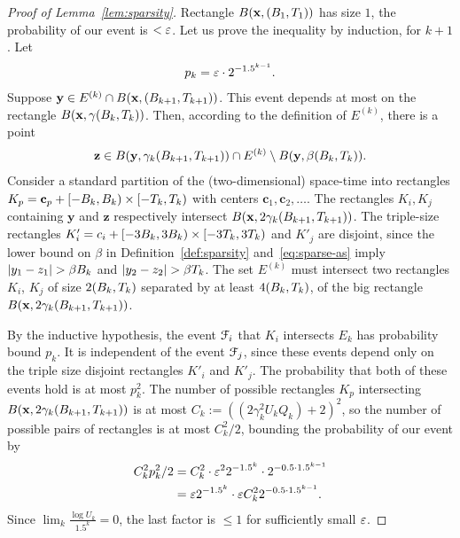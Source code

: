 \documentclass[11pt]{memoir}
\theoremstyle{definition} %
\renewcommand{\le}{\leq}
\renewcommand{\vek}[1]{\mathbf{#1}}
\def\B{B}
\def\U{U}
\newcommand{\Q}{Q} %
\newcommand{\Tu}{T}
\newcommand{\x}{\vek{x}} %
\newcommand{\y}{\vek{y}} %
\begin{document}
\begin{proof}[Proof of Lemma~\ref{lem:sparsity}]
Rectangle \( B(\x,\pair{\B_{1}}{\Tu_{1}}) \) has size \( 1 \),
the probability of our event is \( <\varepsilon \).
Let us prove the inequality by induction, for \( k+1 \).
Let
\begin{align*}
   p_{k}= \varepsilon\cdot 2^{-1.5^{k-1}}.
\end{align*}
Suppose \( \y \in E^{(k)}\cap B(\x,\pair{\B_{k+1}}{\Tu_{k+1}}) \).
This event depends at most on the rectangle \( B(\x,\gamma\pair{\B_{k}}{\Tu_{k}}) \).
Then, according to the definition of \( E^{(k)} \),  there is a point
\begin{align}\label{eq:sparse-as}
 \vek{z} \in
 B(\y,\gamma_{k}\pair{\B_{k+1}}{\Tu_{k+1}})\cap E^{(k)}\setminus B(\y,\beta\pair{\B_{k}}{\Tu_{k}}).
 \end{align}
Consider a standard partition of the (two-dimensional) space-time into
rectangles \( K_{p}=\vek{c}_{p}+\lint{-\B_{k}}{\B_{k}}\times \lint{-\Tu_{k}}{\Tu_{k}} \)
with centers \( \vek{c}_{1},\vek{c}_{2},\dots \).
The rectangles \( K_{i},K_{j} \) containing \( \vek{y} \) and \( \vek{z} \)
respectively intersect \( B(\x, 2\gamma_{k}\pair{\B_{k+1}}{\Tu_{k+1}}) \).
The triple-size rectangles 
\( K'_{i}=c_{i} + \lint{-3\B_{k}}{3\B_{k}}\times \lint{-3\Tu_{k}}{3\Tu_{k}} \) and
\( K'_{j} \) are disjoint, since the lower bound on \( \beta \) in Definition~\ref{def:sparsity}
and~\eqref{eq:sparse-as} imply
 \( \abs{y_{1} - z_{1}}>\beta\B_{k} \) and \( \abs{y_{2} - z_{2}}>\beta\Tu_{k} \).
The set \( E^{(k)} \) must intersect two rectangles \( K_{i} \),
\( K_{j} \) of size \( 2\pair{\B_{k}}{\Tu_{k}} \) separated by at least \( 4\pair{\B_{k}}{\Tu_{k}} \),
of the big rectangle \( B(\x, 2\gamma_{k}\pair{\B_{k+1}}{\Tu_{k+1}}) \).
 
By the inductive hypothesis, the event \( \mathcal{F}_{i} \) that
\( K_{i} \) intersects \( E_{k} \) has probability bound \( p_{k} \).
It is independent of the event \( \mathcal{F}_{j} \), since these events depend
only on the triple size disjoint rectangles \( K'_{i} \) and \( K'_{j} \).
The probability that both of these events hold is at most \( p_{k}^{2} \).
The number of possible rectangles
\( K_{p} \) intersecting \( B(\x, 2\gamma_{k}\pair{\B_{k+1}}{\Tu_{k+1}}) \) is
at most
\( C_{k}:=((2\gamma_{k}^{2}\U_{k} \Q_{k})+2)^{2} \), so the number of possible pairs of rectangles
is at most \( C_{k}^{2}/2 \), bounding the probability of our event by
 \begin{align*}
   C_{k}^{2}p_{k}^{2}/2
    &=
      C_{k}^{2}\cdot \varepsilon^{2} 2^{-1.5^{k}}\cdot 2^{-0.5\cdot 1.5^{k-1}}
   \\ &= \varepsilon 2^{-1.5^{k}} \cdot \varepsilon C_{k}^{2}2^{-0.5\cdot 1.5^{k-1}}.
 \end{align*}
Since \( \lim_{k}\frac{\log\U_{k}}{1.5^k}=0 \),
the last factor is \( \le 1 \) for sufficiently small  \( \varepsilon \).
\end{proof}
\end{document}
